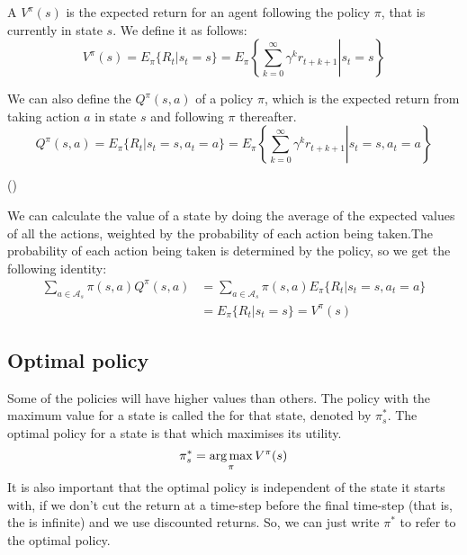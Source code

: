 A  $V^\pi(s)$ is the expected return for an agent following the
policy $\pi$, that is currently in state $s$. We define it as follows:
\begin{equation}
  V^\pi(s) = E_\pi \lbrace R_t | s_t = s \rbrace =
  E_\pi \left\{ \left. \sum_{k=0}^\infty \gamma^kr_{t+k+1} \right| s_t = s \right\}
  \label{eq:definition-value}
\end{equation}

We can also define the  $Q^\pi(s, a)$ of a policy
$\pi$, which is the expected return from taking action $a$ in state $s$ and
following $\pi$ thereafter.
\begin{equation}
  Q^\pi(s, a) = E_\pi \lbrace R_t | s_t = s, a_t = a \rbrace =
  E_\pi \left\{ \left. \sum_{k=0}^\infty \gamma^kr_{t+k+1} \right| s_t = s, a_t = a \right\}
  \label{eq:definition-qvalue}
\end{equation}

(\cite[Section~3.7]{sutton1998introduction})

We can calculate the value of a state by doing the average of the
expected values of all the actions, weighted by the probability of each action
being taken.The probability of each action being taken is determined by the
policy, so we get the following identity:
\begin{equation}
  \begin{split}
  \sum_{a\in\mathcal{A}_s}\pi(s, a) Q^\pi(s, a) & = \sum_{a\in\mathcal{A}_s}\pi(s, a) E_\pi \lbrace R_t | s_t = s, a_t = a \rbrace \\
  & = E_\pi \lbrace R_t | s_t = s \rbrace = V^\pi(s)
  \end{split}
  \label{eq:equivalence-qvalue-value}
\end{equation}


\subsection{Optimal policy\label{subsection:optimal-policy}}

Some of the policies will have higher values than others. The policy with the
maximum value for a state is called the  for that state,
denoted by $\pi^*_s$. The optimal policy for a state is that which maximises its utility.
\begin{equation}
\pi^*_s = \argmax_\pi V^\pi(s)
\end{equation}
It is also important that the optimal policy is independent of the state it
starts with, if we don't cut the return at a time-step before the final
time-step (that is, the  is infinite) and we use discounted
returns. So, we can just write $\pi^*$ to refer to the optimal policy.

